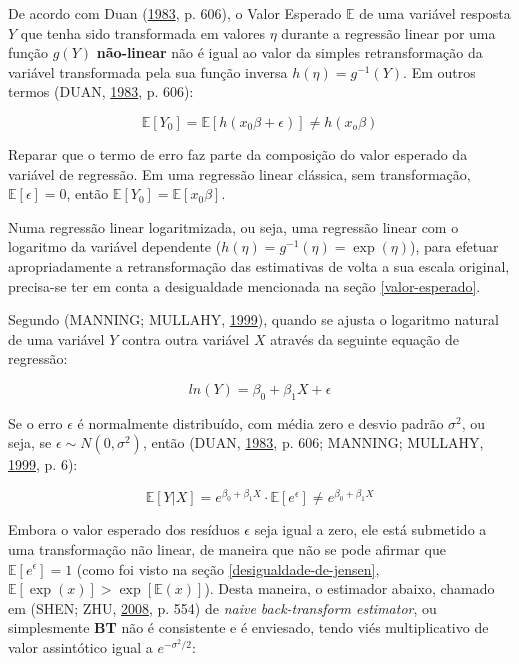\documentclass[a4paper, 12pt]{article}
\begin{document}
De acordo com Duan (\protect\hyperlink{ref-Duan}{1983}, p. 606), o Valor
Esperado \(\mathbb{E}\) de uma variável resposta \(Y\) que tenha sido
transformada em valores \(\eta\) durante a regressão linear por uma
função \(g(Y)\) \textbf{não-linear} não é igual ao valor da simples
retransformação da variável transformada pela sua função inversa
\(h(\eta) = g^{-1}(Y)\). Em outros termos (DUAN,
\protect\hyperlink{ref-Duan}{1983}, p. 606):

\[\mathbb{E}[Y_0] = \mathbb{E}[h(x_0\beta + \epsilon)] \ne h(x_o\beta)\]

Reparar que o termo de erro faz parte da composição do valor esperado da
variável de regressão. Em uma regressão linear clássica, sem
transformação, \(\mathbb{E}[\epsilon] = 0\), então
\(\mathbb{E}[Y_0] = \mathbb{E}[x_0\beta]\).

Numa regressão linear logaritmizada, ou seja, uma regressão linear com o
logaritmo da variável dependente
(\(h(\eta) = g^{-1}(\eta) = \exp(\eta)\)), para efetuar apropriadamente
a retransformação das estimativas de volta a sua escala original,
precisa-se ter em conta a desigualdade mencionada na seção
\ref{valor-esperado}.

Segundo (MANNING; MULLAHY, \protect\hyperlink{ref-NBERt0246}{1999}),
quando se ajusta o logaritmo natural de uma variável \(Y\) contra outra
variável \(X\) através da seguinte equação de regressão:

\[ln(Y) = \beta_0 + \beta_1X + \epsilon\]

Se o erro \(\epsilon\) é normalmente distribuído, com média zero e
desvio padrão \(\sigma^2\), ou seja, se
\(\epsilon \sim N(0, \sigma^2)\), então (DUAN,
\protect\hyperlink{ref-Duan}{1983}, p. 606; MANNING; MULLAHY,
\protect\hyperlink{ref-NBERt0246}{1999}, p. 6):

\[\mathbb{E}[Y|X] = e^{\beta_0 + \beta_1X} \cdot \mathbb{E}[e^\epsilon] \ne e^{\beta_0 + \beta_1X}\]

Embora o valor esperado dos resíduos \(\epsilon\) seja igual a zero, ele
está submetido a uma transformação não linear, de maneira que não se
pode afirmar que \(\mathbb{E}[e^\epsilon] = 1\) (como foi visto na seção
\ref{desigualdade-de-jensen},
\(\mathbb{E}[\exp(x)] > \exp[\mathbb{E}(x)]\)). Desta maneira, o
estimador abaixo, chamado em (SHEN; ZHU,
\protect\hyperlink{ref-shen}{2008}, p. 554) de \emph{naive
back-transform estimator}, ou simplesmente \textbf{BT} não é consistente
e é enviesado, tendo viés multiplicativo de valor assintótico igual a
\(e^{-\sigma^2/2}\):
\end{document}
